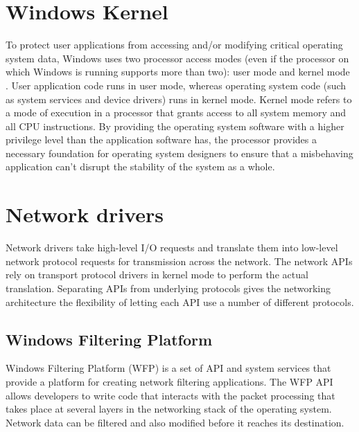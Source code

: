 \vspace{5mm}

\section{Windows Kernel}
\vspace{5mm}

To protect user applications from accessing and/or modifying critical operating system data, Windows
uses two processor access modes (even if the processor on which Windows is running supports more
than two): user mode and kernel mode \cite{BOOK:1} . User application code runs in user mode, whereas operating
system code (such as system services and device drivers) runs in kernel mode. Kernel mode refers to
a mode of execution in a processor that grants access to all system memory and all CPU instructions.
By providing the operating system software with a higher privilege level than the application software
has, the processor provides a necessary foundation for operating system designers to ensure that a
misbehaving application can’t disrupt the stability of the system as a whole.

\vspace{5mm}
\section{Network drivers}
\vspace{5mm}

Network drivers take high-level I/O requests and translate them into low-level network protocol
requests for transmission across the network. The network APIs rely on transport protocol drivers in
kernel mode to perform the actual translation. Separating APIs from underlying protocols gives the
networking architecture the flexibility of letting each API use a number of different protocols.

\vspace{5mm}
\subsection{Windows Filtering Platform}
\vspace{5mm}

Windows Filtering Platform (WFP) is a set of API and system services that provide a platform for creating network filtering applications. The WFP API allows developers to write code that interacts with the packet processing that takes place at several layers in the networking stack of the operating system. Network data can be filtered and also modified before it reaches its destination.

